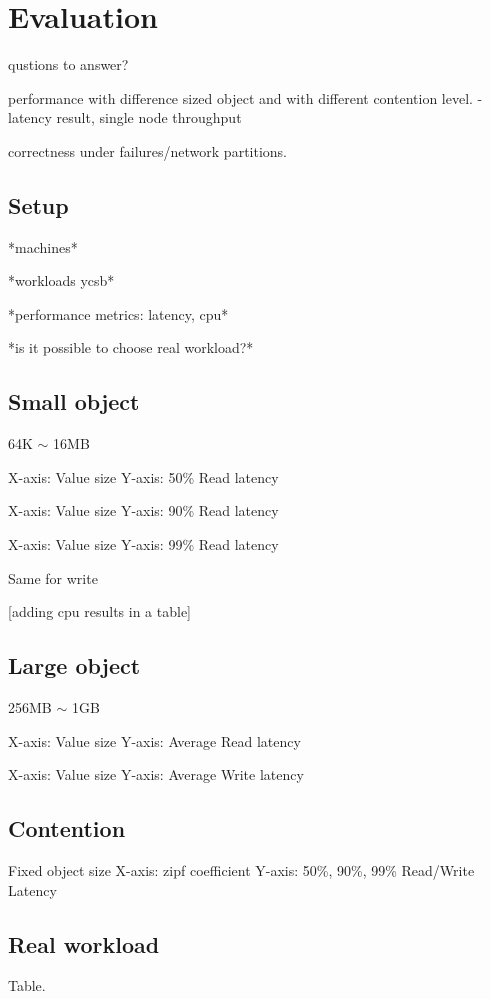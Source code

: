 \section{Evaluation}

qustions to answer?

performance with difference sized object and with different contention level.
 -latency result, single node throughput

correctness under failures/network partitions.
 

\subsection{Setup}
*machines*

*workloads ycsb*

*performance metrics: latency, cpu*

*is it possible to choose real workload?*


\subsection{Small object}
64K $\sim$ 16MB

X-axis: Value size
Y-axis: 50\% Read latency

X-axis: Value size
Y-axis: 90\% Read latency

X-axis: Value size
Y-axis: 99\% Read latency

Same for write

[adding cpu results in a table]

\subsection{Large object}
256MB $\sim$ 1GB

X-axis: Value size
Y-axis: Average Read latency

X-axis: Value size
Y-axis: Average Write latency


\subsection{Contention}

Fixed object size
X-axis: zipf coefficient
Y-axis: 50\%, 90\%, 99\% Read/Write Latency


\subsection{Real workload}
Table.